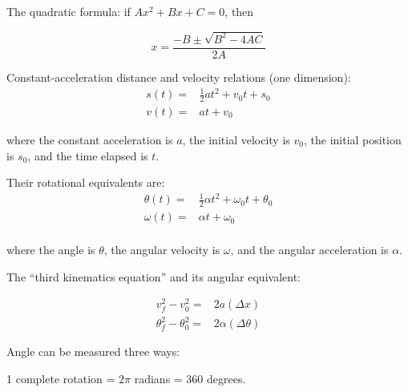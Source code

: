\documentclass[12pt]{article}
\begin{document}
\nonumber

\bigskip
\bigskip
\bigskip
\bigskip

\Large \centerline{}

\normalsize

The quadratic formula: if $Ax^2 + Bx + C = 0$, then

\begin{equation*}
x = \frac{-B \pm \sqrt{B^2-4AC}}{2A}
\end{equation*}

Constant-acceleration distance and velocity relations (one dimension):
\begin{align*}
  s(t) =& \frac{1}{2} at^2 + v_0 t + s_0      \\
  v(t) =& at + v_0    
\end{align*}

where the constant acceleration is $a$, the initial velocity is $v_0$, the initial position is $s_0$, and the time elapsed is $t$.


Their rotational equivalents are:
\begin{align*}
  \theta(t) =& \frac{1}{2} \alpha t^2 + \omega_0 t + \theta_0      \\
  \omega(t) =& \alpha t + \omega_0 \\   
\end{align*}

where the angle is $\theta$, the angular velocity is $\omega$, and the angular acceleration is $\alpha$.

\bigskip

The ``third kinematics equation'' and its angular equivalent:

\begin{align*}
v_f^2 - v_0^2 =& 2a(\Delta x)\\
\theta_f^2 - \theta_0^2 =& 2\alpha(\Delta \theta)
\end{align*}

\bigskip

Angle can be measured three ways:

1 complete rotation = $2\pi$ radians = 360 degrees.
\end{document}
